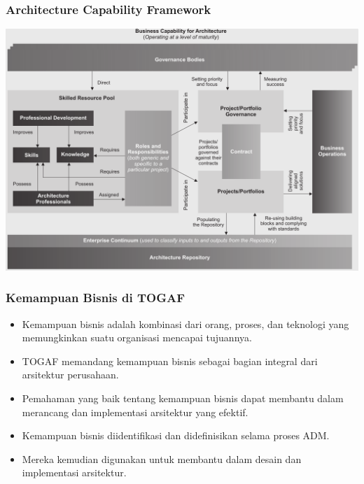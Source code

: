 \documentclass{beamer}
\begin{document}
	{
		\begin{frame}
			\frametitle{Architecture Capability Framework}
			\begin{center}
				\includegraphics[width=.95\textwidth]{../figures/architecture_capability_framework}
			\end{center}
		\end{frame}
	}

	\begin{frame}
		\frametitle{Kemampuan Bisnis di TOGAF}
		\begin{itemize}
			\item Kemampuan bisnis adalah kombinasi dari orang, proses, dan teknologi yang memungkinkan suatu organisasi mencapai tujuannya.
			\item TOGAF memandang kemampuan bisnis sebagai bagian integral dari arsitektur perusahaan.
			\item Pemahaman yang baik tentang kemampuan bisnis dapat membantu dalam merancang dan implementasi arsitektur yang efektif.
			\item Kemampuan bisnis diidentifikasi dan didefinisikan selama proses ADM.
			\item Mereka kemudian digunakan untuk membantu dalam desain dan implementasi arsitektur.
		\end{itemize}
	\end{frame}
	
\end{document}
